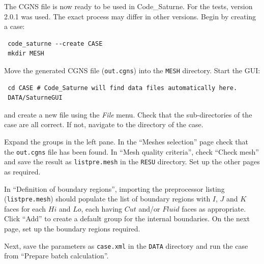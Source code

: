 \documentclass[a4paper,10pt]{article}
\begin{document}
The CGNS file is now ready to be used in Code\_Saturne. For the tests, version
2.0.1 was used. The exact process may differ in other versions. Begin by
creating a case:

\begin{verbatim}
 code_saturne --create CASE
 mkdir MESH
\end{verbatim}

Move the generated CGNS file (\verb|out.cgns|) into the \verb|MESH| directory.
Start the GUI:

\begin{verbatim}
 cd CASE # Code_Saturne will find data files automatically here.
 DATA/SaturneGUI
\end{verbatim}

and create a new file using the \textit{File} menu. Check that the
sub-directories of the case are all correct. If not, navigate to the directory
of the case.

Expand the groups in the left pane. In the ``Meshes selection'' page check that
the \verb|out.cgns| file has been found. In ``Mesh quality criteria'', check
``Check mesh'' and save the result as \verb|listpre.mesh| in the \verb|RESU|
directory. Set up the other pages as required.

In ``Definition of boundary regions'', importing the preprocessor listing
(\texttt{\hyphenchar{}\relax list\-pre\-.mesh}) should populate the list of
boundary regions with $I$, $J$ and $K$ faces for each $Hi$ and $Lo$, each having
$Cut$ and/or $Fluid$ faces as appropriate. Click ``Add'' to create a default
group for the internal boundaries. On the next page, set up the boundary regions
required.

Next, save the parameters as \verb|case.xml| in the \verb|DATA| directory and
run the case from ``Prepare batch calculation''.



\end{document}
